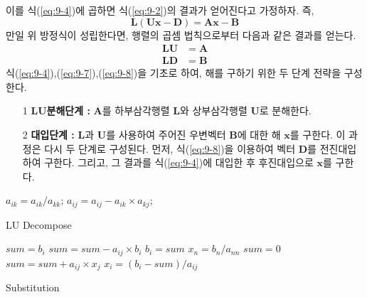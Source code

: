 이를 식(\ref{eq:9-4})에 곱하면 식(\ref{eq:9-2})의 결과가 얻어진다고 가정하자. 즉,
\begin{equation}\label{eq:9-6}
\mathbf{L}\left(\mathbf{Ux}-\mathbf{D}\right)=\mathbf{Ax}-\mathbf{B}
\end{equation}
만일 위 방정식이 성립한다면, 행렬의 곱셈 법칙으로부터 다음과 같은 결과를 얻는다.
\begin{align}
\mathbf{LU}&=\mathbf{A}\label{eq:9-7}\\
\mathbf{LD}&=\mathbf{B}\label{eq:9-8}
\end{align}
식(\ref{eq:9-4}),(\ref{eq:9-7}),(\ref{eq:9-8})을 기초로 하여, 해를 구하기 위한 두 단계 전략을 구성한다.
\begin{itemize}
\item[1] \textbf{LU분해단계 : } $\mathbf{A}$를 하부삼각행렬 $\mathbf{L}$와 상부삼각행렬 $\mathbf{U}$로 분해한다.
\item[2] \textbf{대입단계 : } $\mathbf{L}$과 $\mathbf{U}$를 사용하여 주어진 우변벡터 $\mathbf{B}$에 대한 해 $\mathbf{x}$를 구한다. 이 과정은 다시 두 단계로 구성된다. 먼저, 식(\ref{eq:9-8})을 이용하여 벡터 $\mathbf{D}$를 전진대입하여 구한다. 그리고, 그 결과를 식(\ref{eq:9-4})에 대입한 후 후진대입으로 $\mathbf{x}$를 구한다.
\end{itemize}

\begin{algorithm}
\begin{algorithmic}
    \State $a_{ik}=a_{ik}/a_{kk}$;
      \State $a_{ij}=a_{ij}-a_{ik}\times a_{kj}$;
    \EndFor
  \EndFor
\EndFor
\EndFunction
\end{algorithmic}
\caption{LU Decompose}
\end{algorithm}

\begin{algorithm}
\begin{algorithmic}
  \State $sum=b_{i}$
    \State $sum=sum-a_{ij}\times b_{i}$
  \EndFor
  \State $b_{i}=sum$
\EndFor
{}
\State $x_{n}=b_{n}/a_{nn}$
  \State $sum=0$
    \State $sum=sum+a_{ij}\times x_{j}$
  \EndFor
  \State $x_{i}=(b_{i}-sum)/a_{ij}$
\EndFor
\EndFunction
\end{algorithmic}
\caption{Substitution}
\end{algorithm}

